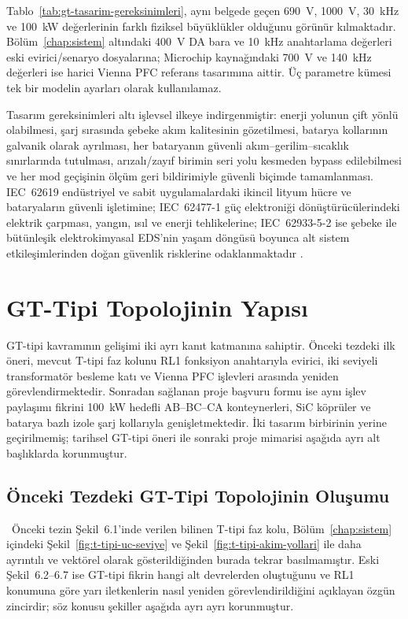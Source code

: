 Tablo~\ref{tab:gt-tasarim-gereksinimleri}, aynı belgede geçen \SI{690}{\volt}, \SI{1000}{\volt}, \SI{30}{\kilo\hertz} ve \SI{100}{\kilo\watt} değerlerinin farklı fiziksel büyüklükler olduğunu görünür kılmaktadır. Bölüm~\ref{chap:sistem} altındaki \SI{400}{\volt} DA bara ve \SI{10}{\kilo\hertz} anahtarlama değerleri eski evirici/senaryo dosyalarına; Microchip kaynağındaki \SI{700}{\volt} ve \SI{140}{\kilo\hertz} değerleri ise harici Vienna PFC referans tasarımına aittir. Üç parametre kümesi tek bir modelin ayarları olarak kullanılamaz.

Tasarım gereksinimleri altı işlevsel ilkeye indirgenmiştir: enerji yolunun çift yönlü olabilmesi, şarj sırasında şebeke akım kalitesinin gözetilmesi, batarya kollarının galvanik olarak ayrılması, her bataryanın güvenli akım--gerilim--sıcaklık sınırlarında tutulması, arızalı/zayıf birimin seri yolu kesmeden bypass edilebilmesi ve her mod geçişinin ölçüm geri bildirimiyle güvenli biçimde tamamlanması. IEC~62619 endüstriyel ve sabit uygulamalardaki ikincil lityum hücre ve bataryaların güvenli işletimine; IEC~62477-1 güç elektroniği dönüştürücülerindeki elektrik çarpması, yangın, ısıl ve enerji tehlikelerine; IEC~62933-5-2 ise şebeke ile bütünleşik elektrokimyasal EDS'nin yaşam döngüsü boyunca alt sistem etkileşimlerinden doğan güvenlik risklerine odaklanmaktadır \citep{IEC62619,IEC62477,IEC62933_5_2}.

\section{GT-Tipi Topolojinin Yapısı}
\label{sec:gt-yapi}

GT-tipi kavramının gelişimi iki ayrı kanıt katmanına sahiptir. Önceki tezdeki ilk öneri, mevcut T-tipi faz kolunu RL1 fonksiyon anahtarıyla evirici, iki seviyeli transformatör besleme katı ve Vienna PFC işlevleri arasında yeniden görevlendirmektedir. Sonradan sağlanan proje başvuru formu ise aynı işlev paylaşımı fikrini \SI{100}{\kilo\watt} hedefli AB--BC--CA konteynerleri, SiC köprüler ve batarya bazlı izole şarj kollarıyla genişletmektedir. İki tasarım birbirinin yerine geçirilmemiş; tarihsel GT-tipi öneri ile sonraki proje mimarisi aşağıda ayrı alt başlıklarda korunmuştur.

\subsection{Önceki Tezdeki GT-Tipi Topolojinin Oluşumu}

\eskitezetiketi\ Önceki tezin Şekil~6.1'inde verilen bilinen T-tipi faz kolu, Bölüm~\ref{chap:sistem} içindeki Şekil~\ref{fig:t-tipi-uc-seviye} ve Şekil~\ref{fig:t-tipi-akim-yollari} ile daha ayrıntılı ve vektörel olarak gösterildiğinden burada tekrar basılmamıştır. Eski Şekil~6.2--6.7 ise GT-tipi fikrin hangi alt devrelerden oluştuğunu ve RL1 konumuna göre yarı iletkenlerin nasıl yeniden görevlendirildiğini açıklayan özgün zincirdir; söz konusu şekiller aşağıda ayrı ayrı korunmuştur.

